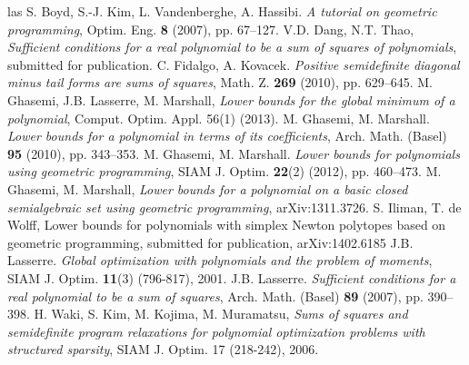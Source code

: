 \documentclass{amsart}
\theoremstyle{definition}
\begin{document}
%
%
\begin{thebibliography}{las}
S. Boyd, S.-J. Kim, L. Vandenberghe, A. Hassibi. {\em A tutorial on geometric programming},
Optim. Eng. {\bf 8} (2007), pp. 67--127.
 V.D. Dang, N.T. Thao, {\em Sufficient conditions for a real polynomial to be a sum of squares of polynomials}, submitted for publication.
C. Fidalgo, A. Kovacek. {\em Positive semidefinite diagonal minus tail forms are sums of squares}, Math. Z. {\bf 269} (2010), pp. 629--645.
M. Ghasemi, J.B. Lasserre, M. Marshall, {\em Lower bounds for the global minimum of a polynomial}, Comput. Optim. Appl. 56(1) (2013).
M. Ghasemi, M. Marshall. {\em Lower bounds for a polynomial in terms of its coefficients}, Arch. Math. (Basel) {\bf 95} (2010), pp. 343--353.
M. Ghasemi, M. Marshall. {\em Lower bounds for polynomials using geometric programming}, SIAM J. Optim. {\bf 22}(2) (2012), pp. 460--473.
 M. Ghasemi, M. Marshall, {\em Lower bounds for a polynomial on a basic closed semialgebraic set using geometric programming},  arXiv:1311.3726.
 S. Iliman, T. de Wolff, Lower bounds for polynomials with simplex Newton polytopes based on geometric programming, submitted for publication, arXiv:1402.6185
J.B. Lasserre. {\em Global optimization with polynomials and the problem of moments}, SIAM J. Optim. {\bf 11}(3) (796-817), 2001.
J.B. Lasserre. {\em Sufficient conditions for a real polynomial to be a sum of squares}, Arch. Math. (Basel) {\bf 89} (2007), pp. 390--398.
 H. Waki, S. Kim, M. Kojima, M. Muramatsu, {\em Sums of squares and semidefinite program relaxations for polynomial optimization problems with structured sparsity}, SIAM J. Optim. 17 (218-242), 2006.
\end{thebibliography}
\end{document}
